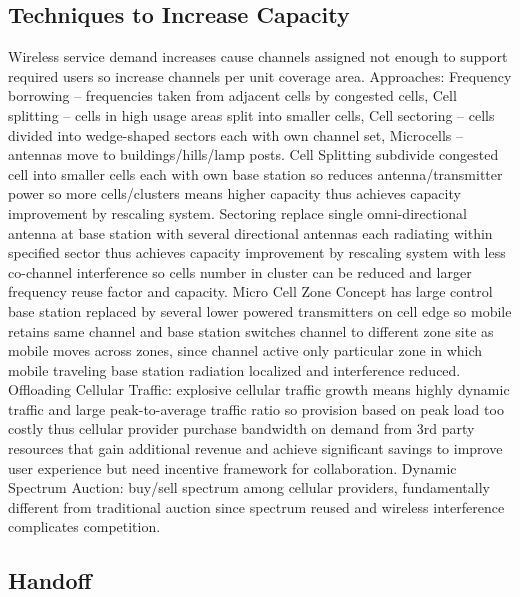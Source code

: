 \documentclass[9pt]{extarticle}
\begin{document}
\begin{multicols}{2}
\subsection{Techniques to Increase Capacity}

Wireless service demand increases cause channels assigned not enough to support required users so increase channels per unit coverage area. Approaches: Frequency borrowing – frequencies taken from adjacent cells by congested cells, Cell splitting – cells in high usage areas split into smaller cells, Cell sectoring – cells divided into wedge-shaped sectors each with own channel set, Microcells – antennas move to buildings/hills/lamp posts. Cell Splitting subdivide congested cell into smaller cells each with own base station so reduces antenna/transmitter power so more cells/clusters means higher capacity thus achieves capacity improvement by rescaling system. Sectoring replace single omni-directional antenna at base station with several directional antennas each radiating within specified sector thus achieves capacity improvement by rescaling system with less co-channel interference so cells number in cluster can be reduced and larger frequency reuse factor and capacity. Micro Cell Zone Concept has large control base station replaced by several lower powered transmitters on cell edge so mobile retains same channel and base station switches channel to different zone site as mobile moves across zones, since channel active only particular zone in which mobile traveling base station radiation localized and interference reduced. Offloading Cellular Traffic: explosive cellular traffic growth means highly dynamic traffic and large peak-to-average traffic ratio so provision based on peak load too costly thus cellular provider purchase bandwidth on demand from 3rd party resources that gain additional revenue and achieve significant savings to improve user experience but need incentive framework for collaboration. Dynamic Spectrum Auction: buy/sell spectrum among cellular providers, fundamentally different from traditional auction since spectrum reused and wireless interference complicates competition.

\subsection{Handoff}


\end{multicols}
\end{document}
